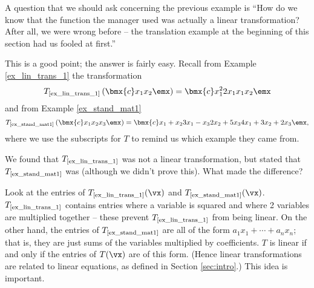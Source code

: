 \medskip

A question that we should ask concerning the previous example is ``How do we know that the function the manager used was actually a linear transformation? After all, we were wrong before -- the translation example at the beginning of this section had us fooled at first.''

This is a good point; the answer is fairly easy. Recall from Example \ref{ex_lin_trans_1} the transformation 
\[
T_{\text{\scriptsize {\ref{ex_lin_trans_1}}}}\left(\bmx{c}x_1\\x_2\emx\right) = \bmx{c}x_1^2\\2x_1\\x_1x_2\emx
\]
and from Example \ref{ex_stand_mat1}
\[
T_{\text{\scriptsize \ref{ex_stand_mat1}}}\left(\bmx{c} x_1\\x_2\\x_3\emx\right) = \bmx{c} x_1+x_2\\ 3x_1-x_3 \\ 2x_2+5x_3 \\ 4x_1+3x_2+2x_3\emx,
\]
where we use the subscripts for $T$ to remind us which example they came from.

We found that $T_{\text{\scriptsize\ref{ex_lin_trans_1}}}$ was not a linear transformation, but stated that $T_{\text{\scriptsize\ref{ex_stand_mat1}}}$ was (although we didn't prove this). What made the difference? 

Look at the entries of $T_{\text{\scriptsize\ref{ex_lin_trans_1}}}(\vx)$ and $T_{\text{\scriptsize\ref{ex_stand_mat1}}}(\vx)$. $T_{\text{\scriptsize\ref{ex_lin_trans_1}}}$ contains entries where a variable is squared and where 2 variables are multiplied together -- these prevent $T_{\text{\scriptsize\ref{ex_lin_trans_1}}}$ from being linear. On the other hand, the entries of $T_{\text{\scriptsize\ref{ex_stand_mat1}}}$ are all of the form $a_1x_1 + \cdots + a_nx_n$; that is, they are just sums of the variables multiplied by coefficients. $T$ is linear if and only if the entries of $T(\vx)$ are of this form. (Hence linear transformations are related to linear equations, as defined in Section \ref{sec:intro}.) This idea is important.

\smallskip


